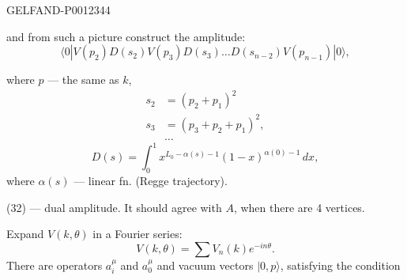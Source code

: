 \begin{GelfandAdjacentEvidence}{GELFAND-P001234}{4}


and from such a picture construct the amplitude:
\begin{equation*}
\langle0|V(p_2)D(s_2)V(p_3)D(s_3)\ldots D(s_{n-2})V(p_{n-1})|0\rangle,
\tag{32}
\end{equation*}
\end{GelfandAdjacentEvidence}

where \(p\) --- the same as \(k\),
\begin{equation*}
\begin{aligned}
s_2&=(p_2+p_1)^2\\
s_3&=(p_3+p_2+p_1)^2,\\
&\ldots
\end{aligned}\tag{33}
\end{equation*}
\begin{equation*}
D(s)=\int_0^1 x^{L_0-\alpha(s)-1}(1-x)^{\alpha(0)-1}\,dx,\tag{34}
\end{equation*}
where \(\alpha(s)\) --- linear fn. (Regge trajectory).

(32) --- dual amplitude. It should agree with \(A\), when there are 4 vertices.

Expand \(V(k,\theta)\) in a Fourier series:
\begin{equation*}
V(k,\theta)=\sum V_n(k)e^{-in\theta}.\tag{35}
\end{equation*}
There are operators \(a_i^\mu\) and \(a_0^\mu\) and vacuum vectors
\(|0,p\rangle\), satisfying the condition


